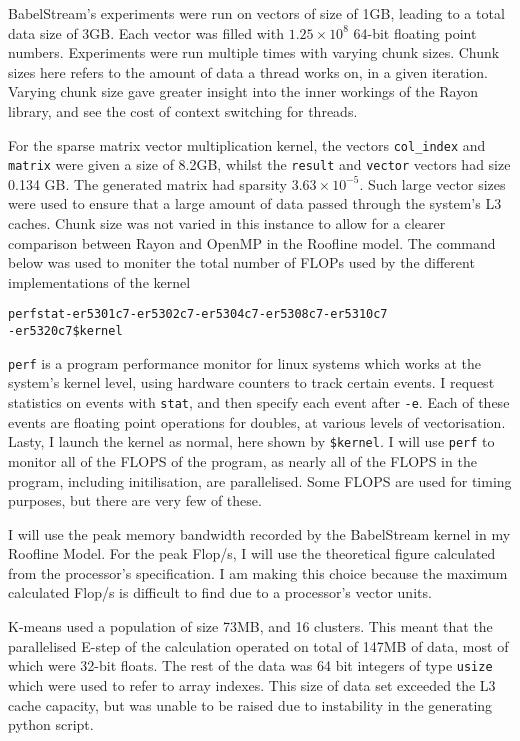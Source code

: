 BabelStream's experiments were run on vectors of size of 1GB, leading to a total data size of 3GB. Each vector was filled with $1.25\times10^8$ 64-bit floating point numbers. Experiments were run multiple times with varying chunk sizes. Chunk sizes here refers to the amount of data a thread works on, in a given iteration. Varying chunk size gave greater insight into the inner workings of the Rayon library, and see the cost of context switching for threads.

For the sparse matrix vector multiplication kernel, the vectors \texttt{col\_index} and \texttt{matrix} were given a size of 8.2GB, whilst the \texttt{result} and \texttt{vector} vectors had size 0.134 GB. The generated matrix had sparsity $3.63 \times 10^{-5}$. Such large vector sizes were used to ensure that a large amount of data passed through the system's L3 caches. Chunk size was not varied in this instance to allow for a clearer comparison between Rayon and OpenMP in the Roofline model. The command below was used to moniter the total number of FLOPs used by the different implementations of the kernel

\begin{alltt}
\footnotesize
perf stat -e r5301c7 -e r5302c7 -e r5304c7 -e r5308c7 -e r5310c7 
          -e r5320c7 \$kernel 
\end{alltt}

\texttt{perf} is a program performance monitor for linux systems which works at the system's kernel level, using hardware counters to track certain events. I request statistics on events with \texttt{stat}, and then specify each event after \texttt{-e}. Each of these events are floating point operations for doubles, at various levels of vectorisation. Lasty, I launch the kernel as normal, here shown by \texttt{\$kernel}.
I will use \texttt{perf} to monitor all of the FLOPS of the program, as nearly all of the FLOPS in the program, including initilisation, are parallelised. Some FLOPS are used for timing purposes, but there are very few of these.

I will use the peak memory bandwidth recorded by the BabelStream kernel in my Roofline Model. For the peak Flop/s, I will use the theoretical figure calculated from the processor's specification. I am making this choice because the maximum calculated Flop/s is difficult to find due to a processor's vector units.

K-means used a population of size 73MB, and 16 clusters. This meant that the parallelised E-step of the calculation operated on total of 147MB of data, most of which were 32-bit floats. The rest of the data was 64 bit integers of type \texttt{usize} which were used to refer to array indexes. This size of data set exceeded the L3 cache capacity, but was unable to be raised due to instability in the generating python script.

